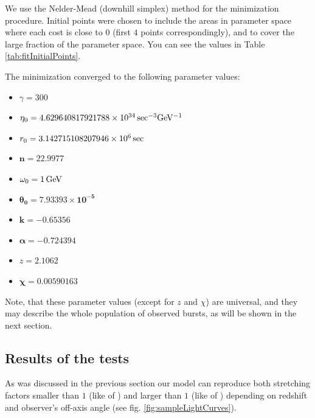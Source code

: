 \documentclass[manuscript]{aastex}
\begin{document}
We use the Nelder-Mead (downhill simplex) method for the minimization
procedure. Initial points were chosen to include the areas in
parameter space where each cost is close to $0$ (first $4$ points
correspondingly), and to cover the large fraction of the parameter
space. You can see the values in Table \ref{tab:fitInitialPoints}.

The minimization converged to the following parameter values:
\begin{multicols}{2}
\begin{itemize}
		\item{$\gamma = 300$}
		\item{$\eta_0 = \unit[4.629640817921788 \times 10^{34}]{sec^{-3} GeV^{-1}}$}
		\item{$r_0 = \unit[3.142715108207946 \times 10^6]{sec}$}
		\item{$\bm{n = 22.9977}$}
		\item{$\omega_0 = \unit[1]{GeV}$}
		\item{$\bm{\theta_0 = 7.93393 \times 10^{-5}}$}
		\item{$\bm{k = -0.65356}$}
		\item{$\bm{\alpha = -0.724394}$}
		\item{$z = 2.1062$}
		\item{$\bm{\chi = 0.00590163}$}
\end{itemize}
\end{multicols}

Note, that these parameter values (except for $z$ and $\chi$) are
universal, and they may describe the whole population of observed
bursts, as will be shown in the next section.

\subsection{Results of the tests}
	
As was discussed in the previous section our model can reproduce both
stretching factors smaller than $1$ (like of ) and larger
than $1$ (like of ) depending on redshift and observer's
off-axis angle (see fig. \ref{fig:sampleLightCurves}).
\end{document}
